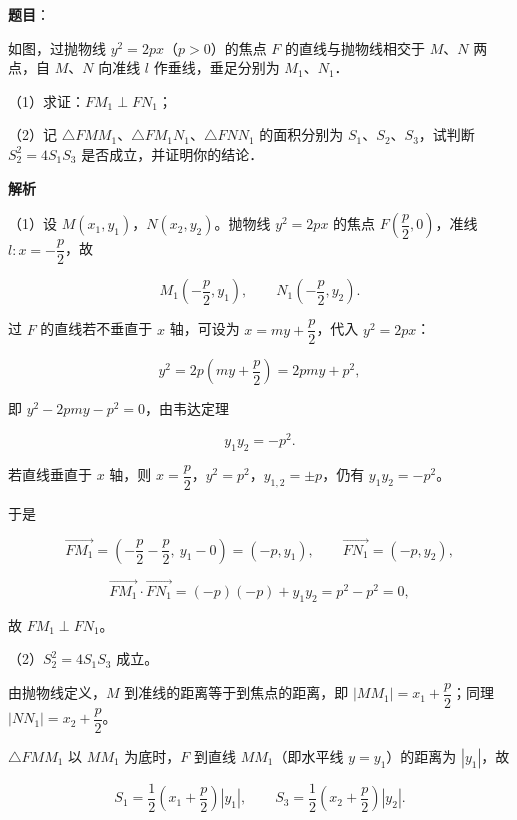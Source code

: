 \begin{answer}

\textbf{题目}：

如图，过抛物线 $y^2=2px$（$p>0$）的焦点 $F$ 的直线与抛物线相交于 $M$、$N$ 两点，自 $M$、$N$ 向准线 $l$ 作垂线，垂足分别为 $M_1$、$N_1$．

（1）求证：$FM_1\perp FN_1$；

（2）记 $\triangle FMM_1$、$\triangle FM_1N_1$、$\triangle FNN_1$ 的面积分别为 $S_1$、$S_2$、$S_3$，试判断 $S_2^2=4S_1S_3$ 是否成立，并证明你的结论．
\nopagebreak[4]
\begin{center}\end{center}
\nopagebreak[4]
\textbf{解析}

（1）设 $M(x_1,y_1)$，$N(x_2,y_2)$。抛物线 $y^2=2px$ 的焦点 $F\left(\dfrac p2,0\right)$，准线 $l:x=-\dfrac p2$，故

\nopagebreak[4]
\[M_1\left(-\frac p2,y_1\right),\qquad N_1\left(-\frac p2,y_2\right).\]

过 $F$ 的直线若不垂直于 $x$ 轴，可设为 $x=my+\dfrac p2$，代入 $y^2=2px$：

\nopagebreak[4]
\[y^2=2p\left(my+\frac p2\right)=2pmy+p^2,\]

即 $y^2-2pmy-p^2=0$，由韦达定理

\nopagebreak[4]
\[y_1y_2=-p^2.\]

若直线垂直于 $x$ 轴，则 $x=\dfrac p2$，$y^2=p^2$，$y_{1,2}=\pm p$，仍有 $y_1y_2=-p^2$。

于是

\nopagebreak[4]
\[\overrightarrow{FM_1}=\left(-\frac p2-\frac p2,\ y_1-0\right)=(-p,y_1),\qquad
\overrightarrow{FN_1}=(-p,y_2),\]

\nopagebreak[4]
\[\overrightarrow{FM_1}\cdot\overrightarrow{FN_1}=(-p)(-p)+y_1y_2=p^2-p^2=0,\]

故 $FM_1\perp FN_1$。

（2）$S_2^2=4S_1S_3$ 成立。

由抛物线定义，$M$ 到准线的距离等于到焦点的距离，即 $|MM_1|=x_1+\dfrac p2$；同理 $|NN_1|=x_2+\dfrac p2$。

$\triangle FMM_1$ 以 $MM_1$ 为底时，$F$ 到直线 $MM_1$（即水平线 $y=y_1$）的距离为 $|y_1|$，故

\nopagebreak[4]
\[S_1=\frac12\left(x_1+\frac p2\right)|y_1|,\qquad
S_3=\frac12\left(x_2+\frac p2\right)|y_2|.\]


\end{answer}
